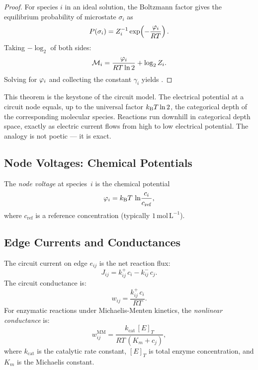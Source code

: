 \begin{proof}
For species $i$ in an ideal solution, the Boltzmann factor gives the
equilibrium probability of microstate $\sigma_i$ as
\begin{equation}
  P(\sigma_i)
  = Z_i^{-1} \exp\!\left(-\frac{\varphi_i}{RT}\right).
  \label{eq:boltzmann}
\end{equation}
Taking $-\log_2$ of both sides:
\begin{equation}
  \mathcal{M}_i
  = \frac{\varphi_i}{RT \ln 2} + \log_2 Z_i.
  \label{eq:depth-from-mu}
\end{equation}
Solving for $\varphi_i$ and collecting the constant $\gamma_i$
yields .
\end{proof}

This theorem is the keystone of the circuit model.  The electrical
potential at a circuit node equals, up to the universal factor
$k_{\mathrm{B}} T \ln 2$, the categorical depth of the corresponding molecular
species.  Reactions run downhill in categorical depth space, exactly
as electric current flows from high to low electrical potential.  The
analogy is not poetic --- it is exact.

\subsection{Node Voltages: Chemical Potentials}

The \emph{node voltage} at species~$i$ is the chemical potential
\begin{equation}
  \varphi_i
  = k_{\mathrm{B}} T\,\ln\!\frac{c_i}{c_{\mathrm{ref}}},
  \label{eq:node-voltage}
\end{equation}
where $c_{\mathrm{ref}}$ is a reference concentration (typically
$1\,\mathrm{mol\,L^{-1}}$).

\subsection{Edge Currents and Conductances}

\begin{definition}
\label{def:edge-current}
The circuit current on edge $e_{ij}$ is the net reaction flux:
\begin{equation}
  J_{ij} = k_{ij}^{+}\,c_i - k_{ij}^{-}\,c_j.
  \label{eq:edge-current}
\end{equation}
The circuit conductance is:
\begin{equation}
  w_{ij} = \frac{k_{ij}^{+}\,c_i}{RT}.
  \label{eq:conductance}
\end{equation}
For enzymatic reactions under Michaelis-Menten kinetics, the
\emph{nonlinear conductance} is:
\begin{equation}
  w_{ij}^{\mathrm{MM}}
  = \frac{k_{\mathrm{cat}}\,[E]_T}{RT\,(K_m + c_j)},
  \label{eq:mm-conductance}
\end{equation}
where $k_{\mathrm{cat}}$ is the catalytic rate constant, $[E]_T$ is total
enzyme concentration, and $K_m$ is the Michaelis constant.
\end{definition}


